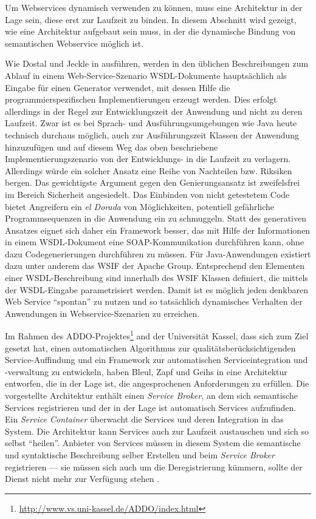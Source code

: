 Um Webservices dynamisch verwenden zu können, muss eine Architektur in der Lage sein, diese erst zur Laufzeit zu binden. In diesem Abschnitt wird gezeigt, wie eine Architektur aufgebaut sein muss, in der die dynamische Bindung von semantischen Webservice möglich ist.

\bigskip

Wie Dostal und Jeckle in \cite[S.61]{xmlspek4} ausführen, werden in den üblichen Beschreibungen zum Ablauf in einem Web-Service-Szenario \ac{WSDL}-Dokumente hauptsächlich als Eingabe für einen Generator verwendet, mit dessen Hilfe die programmierspezifischen Implementierungen erzeugt werden. Dies erfolgt allerdings in der Regel zur Entwicklungszeit der Anwendung und nicht zu deren Laufzeit. Zwar ist es bei Sprach- und Ausführungsumgebungen wie Java heute technisch durchaus möglich, auch zur Ausführungszeit Klassen der Anwendung hinzuzufügen und auf diesem Weg das oben beschriebene Implementierungszenario von der Entwicklungs- in die Laufzeit zu verlagern. Allerdings würde ein solcher Ansatz eine Reihe von Nachteilen bzw. Riksiken bergen. Das gewichtigste Argument gegen den Genierungsansatz ist zweifelsfrei im Bereich Sicherheit angesiedelt. Das Einbinden von nicht getestetem Code bietet Angreifern ein \emph{el Dorada} von Möglichkeiten, potentiell gefährliche Programmsequenzen in die Anwendung ein zu schmuggeln. Statt des generativen Ansatzes eignet sich daher ein Framework besser, das mit Hilfe der Informationen in einem \ac{WSDL}-Dokument eine \ac{SOAP}-Kommunikation durchführen kann, ohne dazu Codegenerierungen durchführen zu müssen. Für Java-Anwendungen existiert dazu unter anderem das \ac{WSIF} der Apache Group. Entsprechend den Elementen einer WSDL-Beschreibung sind innerhalb des \ac{WSIF} Klassen definiert, die mittels der \ac{WSDL}-Eingabe parametrisiert werden. Damit ist es möglich jeden denkbaren Web Service "`spontan"' zu nutzen und so tatsächlich dynamisches Verhalten der Anwendungen in Webservice-Szenarien zu erreichen. 

Im Rahmen des \ac{ADDO}-Projektes\footnote{\url{http://www.vs.uni-kassel.de/ADDO/index.html}} and der Universität Kassel, dass sich zum Ziel gesetzt hat, einen automatischen Algorithmus zur qualitätsberücksichtigenden Service-Auffindung und ein Framework zur automatischen Serviceintegration und -verwaltung zu entwickeln, haben Bleul, Zapf und Geihs in \cite[S.410ff]{flexbrok} eine Architektur entworfen, die in der Lage ist, die angesprochenen Anforderungen zu erfüllen. Die vorgestellte Architektur enthält einen \emph{Service Broker}, an dem sich semantische Services registrieren und der in der Lage ist automatisch Services aufzufinden. Ein \emph{Service Container} überwacht die Services und deren Integration in das System. Die Architektur kann Services auch zur Laufzeit austauschen und sich so selbst "`heilen"'. Anbieter von Services müssen in diesem System die semantische und syntaktische Beschreibung selber Erstellen und beim \emph{Service Broker} registrieren --- sie müssen sich auch um die Deregistrierung kümmern, sollte der Dienst nicht mehr zur Verfügung stehen \cite[S.416]{flexbrok}.

